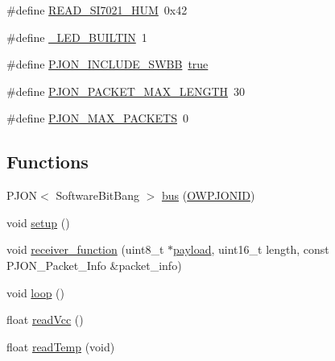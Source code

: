 \begin{DoxyCompactItemize}
\#define \hyperlink{OWP__DG__Si7021__thermo-hygrometer_8ino_a4ea35d51106c57d4e2c02b2880e1cab0}{R\-E\-A\-D\-\_\-\-S\-I7021\-\_\-\-H\-U\-M}~0x42
\item 
\#define \hyperlink{OWP__DG__Si7021__thermo-hygrometer_8ino_a35be658482f544255f771c4c69982391}{\-\_\-\-L\-E\-D\-\_\-\-B\-U\-I\-L\-T\-I\-N}~1
\item 
\#define \hyperlink{OWP__DG__Si7021__thermo-hygrometer_8ino_a41b4a27a2b3fe2878cdec063b22f5fc5}{P\-J\-O\-N\-\_\-\-I\-N\-C\-L\-U\-D\-E\-\_\-\-S\-W\-B\-B}~\hyperlink{stdbool_8h_a41f9c5fb8b08eb5dc3edce4dcb37fee7}{true}
\item 
\#define \hyperlink{OWP__DG__Si7021__thermo-hygrometer_8ino_a58d21a16328181d94e377cb6dd32f680}{P\-J\-O\-N\-\_\-\-P\-A\-C\-K\-E\-T\-\_\-\-M\-A\-X\-\_\-\-L\-E\-N\-G\-T\-H}~30
\item 
\#define \hyperlink{OWP__DG__Si7021__thermo-hygrometer_8ino_af093da5eac99580be6ba61b4dc79f2c1}{P\-J\-O\-N\-\_\-\-M\-A\-X\-\_\-\-P\-A\-C\-K\-E\-T\-S}~0
\end{DoxyCompactItemize}
\subsection*{Functions}
\begin{DoxyCompactItemize}
\item 
P\-J\-O\-N$<$ Software\-Bit\-Bang $>$ \hyperlink{OWP__DG__Si7021__thermo-hygrometer_8ino_a5b555b33c74db25f14ae6a0906d55596}{bus} (\hyperlink{OWP__DG__Si7021__thermo-hygrometer_8ino_aff6283040066cbe0e6d17cbcd83abffc}{O\-W\-P\-J\-O\-N\-I\-D})
\item 
void \hyperlink{OWP__DG__Si7021__thermo-hygrometer_8ino_a4fc01d736fe50cf5b977f755b675f11d}{setup} ()
\item 
void \hyperlink{OWP__DG__Si7021__thermo-hygrometer_8ino_a76fc5e73c141f748dcc1809fdcfa1714}{receiver\-\_\-function} (uint8\-\_\-t $\ast$\hyperlink{Uno__Dragino__LoRa__GPS__Shield__TTN_8ino_a78a402d1762842473567de90b11ed256}{payload}, uint16\-\_\-t length, const P\-J\-O\-N\-\_\-\-Packet\-\_\-\-Info \&packet\-\_\-info)
\item 
void \hyperlink{OWP__DG__Si7021__thermo-hygrometer_8ino_afe461d27b9c48d5921c00d521181f12f}{loop} ()
\item 
float \hyperlink{OWP__DG__Si7021__thermo-hygrometer_8ino_a0b3195c3893f02cb1b80d878b89549d6}{read\-Vcc} ()
\item 
float \hyperlink{OWP__DG__Si7021__thermo-hygrometer_8ino_ada109bb0cdc12131465dfe7a74f93b1e}{read\-Temp} (void)
\end{DoxyCompactItemize}
